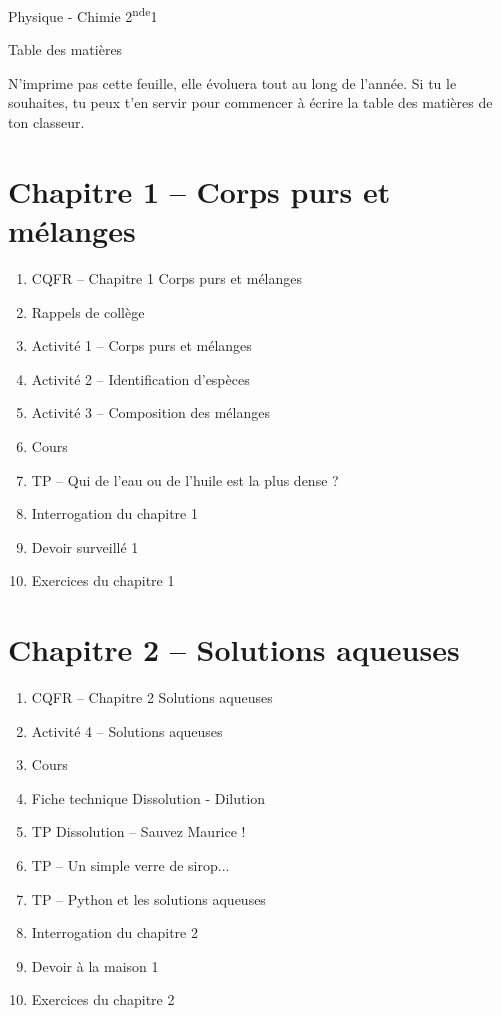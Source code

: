 \documentclass[12pt,a4paper]{article}
\begin{document}
\begin{header}
Physique - Chimie 2\textsuperscript{nde}1

Table des matières
\end{header}

N'imprime pas cette feuille, elle évoluera tout au long de l'année.
Si tu le souhaites, tu peux t'en servir pour commencer à écrire la table des matières de ton classeur.

\section*{Chapitre 1 -- Corps purs et mélanges}

\begin{enumerate}
\item CQFR -- Chapitre 1 Corps purs et mélanges
\item Rappels de collège
\item Activité 1 -- Corps purs et mélanges
\item Activité 2 -- Identification d'espèces
\item Activité 3 -- Composition des mélanges
\item Cours
\item TP -- Qui de l'eau ou de l'huile est la plus dense ?
\item Interrogation du chapitre 1
\item Devoir surveillé 1
\item Exercices du chapitre 1
\end{enumerate}

\section*{Chapitre 2 -- Solutions aqueuses}

\begin{enumerate}
\item CQFR -- Chapitre 2 Solutions aqueuses
\item Activité 4 -- Solutions aqueuses
\item Cours
\item Fiche technique Dissolution - Dilution
\item TP Dissolution -- Sauvez Maurice !
\item TP -- Un simple verre de sirop...
\item TP -- Python et les solutions aqueuses
\item Interrogation du chapitre 2
\item Devoir à la maison 1
\item Exercices du chapitre 2
\end{enumerate}
\end{document}

